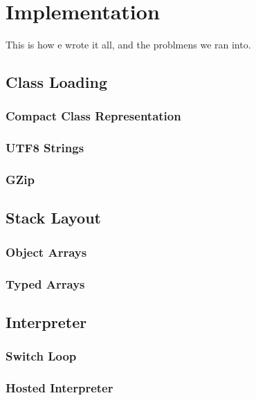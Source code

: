 \documentclass{acm_proc_article-sp}
\begin{document}
\section{Implementation}

This is how e wrote it all, and the problmens we ran into.

\subsection{Class Loading}

\subsubsection{Compact Class Representation}

\subsubsection{UTF8 Strings}

\subsubsection{GZip}

\subsection{Stack Layout}

\subsubsection{Object Arrays}

\subsubsection{Typed Arrays}

\subsection{Interpreter}

\subsubsection{Switch Loop}

\subsubsection{Hosted Interpreter}
\end{document}
